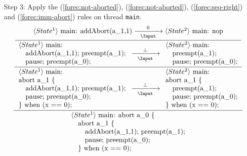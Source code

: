 \noindent
Step 3: Apply the (\ref{forec:not-aborted}), (\ref{forec:not-aborted}), (\ref{forec:seq-right}) and 
(\ref{forec:imm-abort}) rules on thread \verb$main$.
\begin{equation*}
	\frac{
		\dfrac{
			\dfrac{
					\langle State^1 \rangle ~ \text{main: addAbort(a\_1,1)}
						\xrightarrow[~~\Input~~]{0}
					\langle State^2 \rangle ~ \text{main: nop}
				}{
					\begin{array}{l}
						\langle State^1 \rangle ~ \text{main:}		\\
						\text{~~~addAbort(a\_1,1); preempt(a\_1);}	\\
						\text{~~~pause; preempt(a\_0);}				
					\end{array}
						\xrightarrow[~~\Input~~]{\bot} 
					\begin{array}{l}
						\langle State^2 \rangle ~ \text{main:}		\\
						\text{~~~preempt(a\_1);}					\\
						\text{~~~pause; preempt(a\_0);}				
					\end{array}
				}
			}{
				\begin{array}{l}
					\langle State^1 \rangle ~ \text{main:}		\\
					\text{abort a\_1 \{}						\\
					\text{~~~addAbort(a\_1,1); preempt(a\_1);}	\\
					\text{~~~pause; preempt(a\_0);}				\\
					\text{\} when (x == 0);}					
				\end{array}
					\xrightarrow[~~\Input~~]{\bot} 
				\begin{array}{l}
					\langle State^2 \rangle ~ \text{main:}		\\
					\text{abort a\_1 \{}						\\
					\text{~~~preempt(a\_1);}					\\
					\text{~~~pause; preempt(a\_0);}				\\
					\text{\} when (x == 0);}					
				\end{array}
			}
		}{
			\begin{array}{l}
				\langle State^1 \rangle ~ \text{main: abort a\_0 \{}	\\
				\text{~~~abort a\_1 \{}									\\
				\text{~~~~~~addAbort(a\_1,1); preempt(a\_1);}			\\
				\text{~~~~~~pause; preempt(a\_0);}						\\
				\text{~~~\} when (x == 0);}								\\

\end{array}}
\end{equation*}
